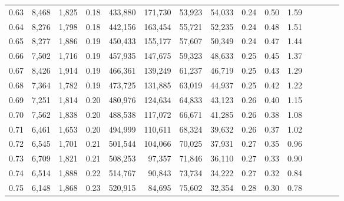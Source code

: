 \begin{tabular}{rrrcrrrrrrrrrrr}
0.63 &   8,468 &  1,825 &                                       0.18 &  433,880 &  171,730 &   53,923 &   54,033 &  0.24 &  0.50 &                         1.59 \\
0.64 &   8,276 &  1,798 &                                       0.18 &  442,156 &  163,454 &   55,721 &   52,235 &  0.24 &  0.48 &                         1.51 \\
0.65 &   8,277 &  1,886 &                                       0.19 &  450,433 &  155,177 &   57,607 &   50,349 &  0.24 &  0.47 &                         1.44 \\
0.66 &   7,502 &  1,716 &                                       0.19 &  457,935 &  147,675 &   59,323 &   48,633 &  0.25 &  0.45 &                         1.37 \\
0.67 &   8,426 &  1,914 &                                       0.19 &  466,361 &  139,249 &   61,237 &   46,719 &  0.25 &  0.43 &                         1.29 \\
0.68 &   7,364 &  1,782 &                                       0.19 &  473,725 &  131,885 &   63,019 &   44,937 &  0.25 &  0.42 &                         1.22 \\
0.69 &   7,251 &  1,814 &                                       0.20 &  480,976 &  124,634 &   64,833 &   43,123 &  0.26 &  0.40 &                         1.15 \\
0.70 &   7,562 &  1,838 &                                       0.20 &  488,538 &  117,072 &   66,671 &   41,285 &  0.26 &  0.38 &                         1.08 \\
0.71 &   6,461 &  1,653 &                                       0.20 &  494,999 &  110,611 &   68,324 &   39,632 &  0.26 &  0.37 &                         1.02 \\
0.72 &   6,545 &  1,701 &                                       0.21 &  501,544 &  104,066 &   70,025 &   37,931 &  0.27 &  0.35 &                         0.96 \\
0.73 &   6,709 &  1,821 &                                       0.21 &  508,253 &   97,357 &   71,846 &   36,110 &  0.27 &  0.33 &                         0.90 \\
0.74 &   6,514 &  1,888 &                                       0.22 &  514,767 &   90,843 &   73,734 &   34,222 &  0.27 &  0.32 &                         0.84 \\
0.75 &   6,148 &  1,868 &                                       0.23 &  520,915 &   84,695 &   75,602 &   32,354 &  0.28 &  0.30 &                         0.78 \\

\end{tabular}

